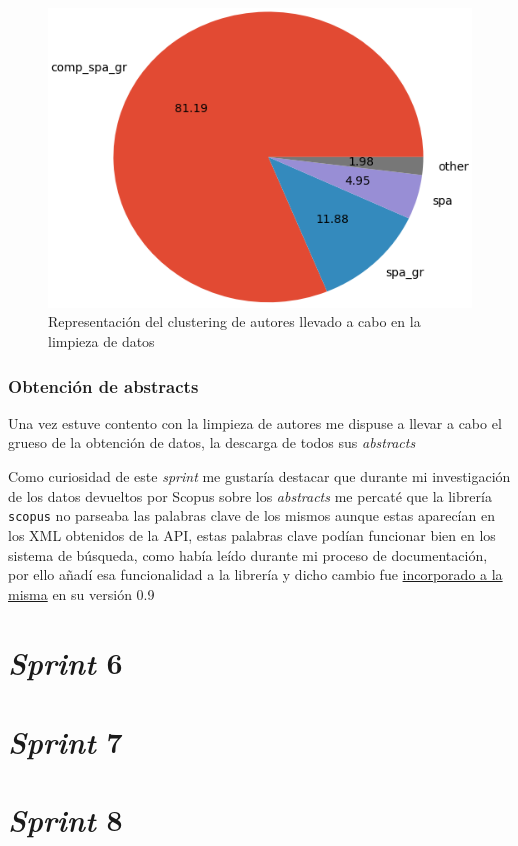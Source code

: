 \begin{figure}[h]
	
	\centering
	\includegraphics[width=0.5\linewidth]{imagenes/class_pie}
	\caption{Representación del clustering de autores llevado a cabo en la limpieza de datos}
\end{figure}

\subsubsection{Obtención de abstracts}
Una vez estuve contento con la limpieza de autores me dispuse a llevar a cabo el grueso de la obtención de datos, la descarga de todos sus \textit{abstracts}

Como curiosidad de este \textit{sprint} me gustaría destacar que durante mi investigación de los datos devueltos por Scopus sobre los \textit{abstracts} me percaté que la librería \texttt{scopus} no parseaba las palabras clave de los mismos aunque estas aparecían en los \acrshort{XML} obtenidos de la \acrshort{API}, estas palabras clave podían funcionar bien en los sistema de búsqueda, como había leído durante mi proceso de documentación, por ello añadí esa funcionalidad a la librería y dicho cambio fue \href{https://github.com/scopus-api/scopus/pull/68}{incorporado a la misma} en su versión 0.9
\section{\textit{Sprint} 6}

\section{\textit{Sprint} 7}

\section{\textit{Sprint} 8}